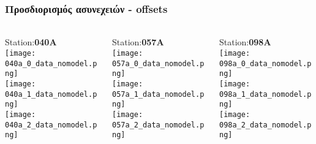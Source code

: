 \begin{frame}
  \frametitle{Προσδιορισμός ασυνεχειών - offsets}
  \framesubtitle{}
  \label{}
  \vskip-1cm
  \begin{columns}[T]
    \begin{column}{.33\textwidth}
      \begin{center}
      Station:\textbf{040A}\\
         \texttt{[image: 040a\_0\_data\_nomodel.png]}\\
         \texttt{[image: 040a\_1\_data\_nomodel.png]}\\
         \texttt{[image: 040a\_2\_data\_nomodel.png]}
       \end{center} 
    \end{column}
    \begin{column}{.33\textwidth}
      \begin{center}
      Station:\textbf{057A}\\
         \texttt{[image: 057a\_0\_data\_nomodel.png]}\\
         \texttt{[image: 057a\_1\_data\_nomodel.png]}\\
         \texttt{[image: 057a\_2\_data\_nomodel.png]}
       \end{center} 
    \end{column}
    \begin{column}{.33\textwidth}
      \begin{center}
      Station:\textbf{098A}\\
         \texttt{[image: 098a\_0\_data\_nomodel.png]}\\
         \texttt{[image: 098a\_1\_data\_nomodel.png]}\\
         \texttt{[image: 098a\_2\_data\_nomodel.png]}
       \end{center} 
      
    \end{column}
  \end{columns}
\end{frame}
\note{}

